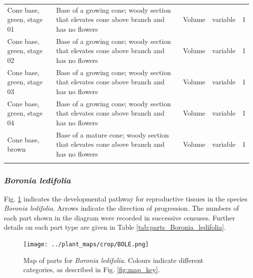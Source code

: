 \documentclass[10pt,twoside]{article}\usepackage[]{graphicx}\usepackage[]{color}
\begin{document}
\begin{longtable}{p{4.5cm}p{6cm}p{2cm}p{1cm}p{1cm}}
  Cone base, green, stage 01 & Base of a growing cone; woody section that elevates cone above branch and has no flowers & Volume & variable &   1 \\ 
  Cone base, green, stage 02 & Base of a growing cone; woody section that elevates cone above branch and has no flowers & Volume & variable &   1 \\ 
  Cone base, green, stage 03 & Base of a growing cone; woody section that elevates cone above branch and has no flowers & Volume & variable &   1 \\ 
  Cone base, green, stage 04 & Base of a growing cone; woody section that elevates cone above branch and has no flowers & Volume & variable &   1 \\ 
  Cone base, brown & Base of a mature cone; woody section that elevates cone above branch and has no flowers & Volume & variable &   1 \\ 
   \hline
\hline
\label{tab:parts_Banksia_ericifolia}
\end{longtable}
\endgroup



\clearpage

\subsubsection{\emph{Boronia ledifolia}}

Fig. \ref{fig:map_Boronia_ledifolia} indicates the developmental pathway for reproductive tissues in the species \emph{Boronia ledifolia}. Arrows indicate the direction of progression.  The numbers of each part shown in the diagram were recorded in successive censuses. Further details on each part type are given in Table \ref{tab:parts_Boronia_ledifolia}.


\begin{figure}[h]
\centering
\texttt{[image: ../plant\_maps/crop/BOLE.png]}
\caption{Map of parts for \emph{Boronia ledifolia}. Colours indicate different categories, as described in Fig. \ref{fig:map_key}.}
\label{fig:map_Boronia_ledifolia}
\end{figure}
\end{document}
